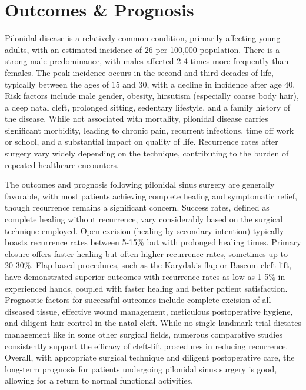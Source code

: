 \section*{Outcomes \& Prognosis}
Pilonidal disease is a relatively common condition, primarily affecting young adults, with an estimated incidence of 26 per 100,000 population. There is a strong male predominance, with males affected 2-4 times more frequently than females. The peak incidence occurs in the second and third decades of life, typically between the ages of 15 and 30, with a decline in incidence after age 40. Risk factors include male gender, obesity, hirsutism (especially coarse body hair), a deep natal cleft, prolonged sitting, sedentary lifestyle, and a family history of the disease. While not associated with mortality, pilonidal disease carries significant morbidity, leading to chronic pain, recurrent infections, time off work or school, and a substantial impact on quality of life. Recurrence rates after surgery vary widely depending on the technique, contributing to the burden of repeated healthcare encounters.

The outcomes and prognosis following pilonidal sinus surgery are generally favorable, with most patients achieving complete healing and symptomatic relief, though recurrence remains a significant concern. Success rates, defined as complete healing without recurrence, vary considerably based on the surgical technique employed. Open excision (healing by secondary intention) typically boasts recurrence rates between 5-15\% but with prolonged healing times. Primary closure offers faster healing but often higher recurrence rates, sometimes up to 20-30\%. Flap-based procedures, such as the Karydakis flap or Bascom cleft lift, have demonstrated superior outcomes with recurrence rates as low as 1-5\% in experienced hands, coupled with faster healing and better patient satisfaction. Prognostic factors for successful outcomes include complete excision of all diseased tissue, effective wound management, meticulous postoperative hygiene, and diligent hair control in the natal cleft. While no single landmark trial dictates management like in some other surgical fields, numerous comparative studies consistently support the efficacy of cleft-lift procedures in reducing recurrence. Overall, with appropriate surgical technique and diligent postoperative care, the long-term prognosis for patients undergoing pilonidal sinus surgery is good, allowing for a return to normal functional activities.

